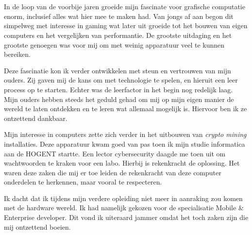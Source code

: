 
\chapter*{}%
\label{ch:voorwoord}


In de loop van de voorbije jaren groeide mijn fascinate voor grafische computatie enorm, inclusief alles wat hier mee te maken had. Van jongs af aan begon dit simpelweg met interesse in gaming wat later uit groeide tot het bouwen van eigen computers en het vergelijken van performantie. De grootste uitdaging en het grootste genoegen was voor mij om met weinig apparatuur veel te kunnen bereiken. 

\bigbreak{}

Deze fascinatie kon ik verder ontwikkelen met steun en vertrouwen van mijn ouders. Zij gaven mij de kans om met technologie te spelen, en hieruit een leer process op te starten. Echter was de leerfactor in het begin nog redelijk laag. Mijn ouders hebben steeds het geduld gehad om mij op mijn eigen manier de wereld te laten ontdekken en te leren wat allemaal mogelijk is. Hiervoor ben ik ze ontzettend dankbaar.

\bigbreak{}

Mijn interesse in computers zette zich verder in het uitbouwen van \textit{crypto mining} installaties. Deze apparatuur kwam goed van pas toen ik mijn studie informatica aan de HOGENT startte. Een lector cybersecurity daagde me toen uit om wachtwoorden te kraken voor een labo. Hierbij is rekenkracht de oplossing. Het waren deze zaken die mij er toe leiden de rekenkracht van deze computer onderdelen te herkennen, maar vooral te respecteren. 

\bigbreak{}

Ik dacht dat ik tijdens mijn verdere opleiding niet meer in aanraking zou komen met de hardware wereld. Ik had namelijk gekozen voor de specialisatie Mobile \& Enterprise developer. Dit vond ik uiteraard jammer omdat het toch zaken zijn die mij ontzettend boeien.

